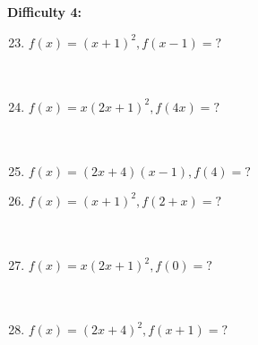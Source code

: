 \documentclass{article}
\begin{document}
\vspace{4cm}
\noindent
\textbf{Difficulty 4:}
\\
\begin{minipage}[t]{0.45\textwidth}
    \begin{enumerate}
        \setcounter{enumi}{22}
        \item $f(x)=(x+1)^2, f(x-1)=?$
        \\\\\\
        \item $f(x)=x(2x+1)^2, f(4x)=?$
        \\\\\\
        \item $f(x)=(2x+4)(x-1), f(4)=?$

    \end{enumerate}
\end{minipage}%
\hfill
\begin{minipage}[t]{0.45\textwidth}
    \begin{enumerate}
        \setcounter{enumi}{25} %
        \item $f(x)=(x+1)^2, f(2+x)=?$
        \\\\\\
        \item $f(x)=x(2x+1)^2, f(0)=?$
        \\\\\\
        \item $f(x)=(2x+4)^2, f(x+1)=?$

    \end{enumerate}
\end{minipage}
\end{document}
